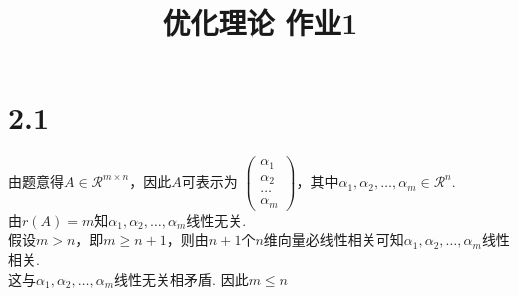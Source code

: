 \documentclass{article}
\title{优化理论 作业1}
\author{}
\date{}
\begin{document}
\section*{2.1}
\noindent 
由题意得$A\in \mathcal{R}^{m\times n}$，因此$A$可表示为
$\left(
    \begin{array}{c}
        \alpha_1 \\
        \alpha_2 \\
        \dots \\
        \alpha_m
    \end{array}
\right)$，其中$\alpha_1,\alpha_2,\dots,\alpha_m \in \mathcal{R}^n.$\\
由$r(A)=m$知$\alpha_1,\alpha_2,\dots,\alpha_m$线性无关.\\
假设$m>n$，即$m\geq n+1$，则由$n+1$个$n$维向量必线性相关可知$\alpha_1,\alpha_2,\dots,\alpha_m$线性相关.\\
这与$\alpha_1,\alpha_2,\dots,\alpha_m$线性无关相矛盾.
因此$m\leq n$
\end{document}
